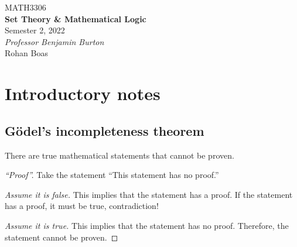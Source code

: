 \documentclass{article}
\date{}
\newcommand{\unitName}{Set Theory \& Mathematical Logic}
\newcommand{\unitCode}{MATH3306}
\newcommand{\unitTime}{Semester 2, 2022}
\newcommand{\unitCoordinator}{Professor Benjamin Burton}
\newcommand{\documentAuthors}{Rohan Boas}
\begin{document}
\begin{titlepage}
    \vspace*{\fill}
    \begin{center}
        \Large{\unitCode} \\[0.05in]
        \LARGE{\textbf{\unitName}} \\[0.1in]
        \normalsize{\unitTime} \\[0.2in]
        \normalsize\textit{\unitCoordinator} \\[0.2in]
        \documentAuthors
    \end{center}
    \vspace*{\fill}
    \doclicenseThis
    \thispagestyle{empty}
\end{titlepage}
\newpage

\tableofcontents
\newpage

\section{Introductory notes}
\subsection{Gödel's incompleteness theorem}
\begin{theorem}
    There are true mathematical statements that cannot be proven.
\end{theorem}
\begin{proof}[``Proof'']
    Take the statement ``This statement has no proof.''

    \emph{Assume it is false.}
    This implies that the statement has a proof.
    If the statement has a proof, it must be true, contradiction!

    \emph{Assume it is true.}
    This implies that the statement has no proof.
    Therefore, the statement cannot be proven.
\end{proof}
\end{document}
